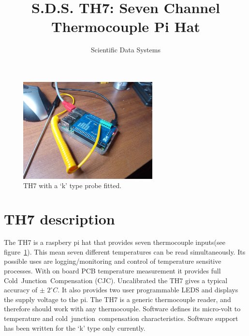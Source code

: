 \documentclass[10pt,foldmark]{leaflet}
\title{S.D.S. TH7: Seven Channel Thermocouple  Pi Hat}
\author{Scientific Data Systems}
\begin{document}
\maketitle

\begin{figure}
 \centering
 \includegraphics[width=200pt]{./TH7_0p4_IMG_20181010_184556D.jpg}
 \caption{TH7 with a `k' type probe fitted.}
 \label{fig:th7}
\end{figure}



\section{TH7 description}
The TH7 is a raspbery pi hat   that
provides seven thermocouple inputs(see figure~\ref{fig:th7}). This mean seven different temperatures can be read
simultaneously. Its possible uses are 
logging/monitoring and control of temperature sensitive processes.
%
With on board PCB temperature measurement
it provides full Cold~Junction~Compensation (CJC).
Uncalibrated the TH7 gives a typical accuracy of $\pm$ ${2}^{\circ} C$.
It also provides two user programmable LEDS and displays the supply voltage to the pi.
\clearpage
The TH7 is a generic thermocouple reader, and therefore should work with any thermocouple.
Software defines its micro-volt to temperature and cold~junction~compensation characteristics.
Software support has been written for the `k' type only currently.

\end{document}
